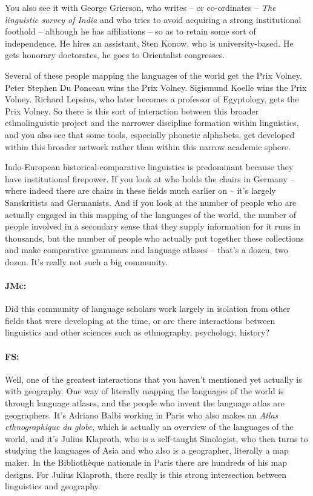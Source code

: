 \documentclass[output=paper]{langscibook}
\begin{document}
You also see it with George Grierson, who writes – or co-ordinates – \textit{The linguistic survey of India} and who tries to avoid acquiring a strong institutional foothold – although he has affiliations – so as to retain some sort of independence. He hires an assistant, Sten Konow, who is university-based. He gets honorary doctorates, he goes to Orientalist congresses. 

Several of these people mapping the languages of the world get the Prix Volney. Peter Stephen Du Ponceau wins the Prix Volney. Sigismund Koelle wins the Prix Volney. Richard Lepsius, who later becomes a professor of Egyptology, gets the Prix Volney. So there is this sort of interaction between this broader ethnolinguistic project and the narrower discipline formation within linguistics, and you also see that some tools, especially phonetic alphabets, get developed within this broader network rather than within this narrow academic sphere. 

Indo-European historical-comparative linguistics is predominant because they have institutional firepower. If you look at who holds the chairs in Germany – where indeed there are chairs in these fields much earlier on – it’s largely Sanskritists and Germanists. And if you look at the number of people who are actually engaged in this mapping of the languages of the world, the number of people involved in a secondary sense that they supply information for it runs in thousands, but the number of people who actually put together these collections and make comparative grammars and language atlases – that’s a dozen, two dozen. It’s really not such a big community.


\paragraph*{JMc:}  Did this community of language scholars work largely in isolation from other fields that were developing at the time, or are there interactions between linguistics and other sciences such as ethnography, psychology, history?


\paragraph*{FS:}  Well, one of the greatest interactions that you haven’t mentioned yet actually is with geography. One way of literally mapping the languages of the world is through language atlases, and the people who invent the language atlas are geographers. It’s Adriano Balbi working in Paris who also makes an \textit{Atlas ethnographique du globe}, which is actually an overview of the languages of the world, and it’s Julius Klaproth, who is a self-taught Sinologist, who then turns to studying the languages of Asia and who also is a geographer, literally a map maker. In the Bibliothèque nationale in Paris there are hundreds of his map designs. For Julius Klaproth, there really is this strong intersection between linguistics and geography.
\end{document}
